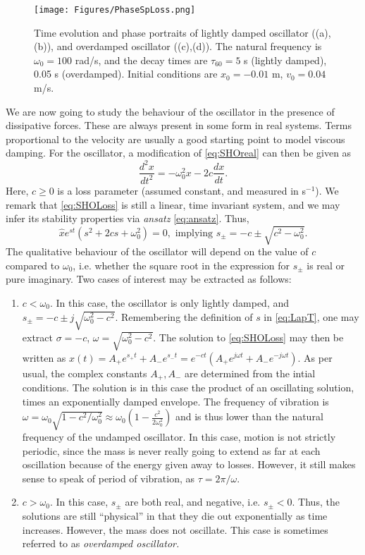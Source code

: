 \documentclass[11pt,twoside,a4paper,english]{book}
\begin{document}
\begin{figure}[hbt]
    \centering
    \texttt{[image: Figures/PhaseSpLoss.png]}
    \caption{Time evolution and phase portraits of lightly damped oscillator ((a),(b)), and overdamped oscillator ((c),(d)). The natural frequency is $\omega_0=100$ rad/s, and the decay times are $\tau_{60}=5$ s (lightly damped), 0.05 s (overdamped). Initial conditions are $x_0=-0.01$ m, $v_0=0.04$ m/s.}\label{fig:dampedOsc}
\end{figure}
We are now going to study the behaviour of the oscillator in the presence of dissipative forces. These are always present in some form in real systems. Terms proportional to the velocity are usually a good starting point to model viscous damping. For the oscillator, a modification of \eqref{eq:SHOreal} can then be given as
\begin{equation}\label{eq:SHOLoss}
    \frac{d^2 x}{dt^2} = -\omega_0^2 x - 2c \frac{dx}{dt}.
\end{equation}
Here, $c \geq 0$ is a loss parameter (assumed constant, and measured in s$^{-1}$). We remark that \eqref{eq:SHOLoss} is still a linear, time invariant system, and we may infer its stability properties via \emph{ansatz} \eqref{eq:ansatz}. Thus, 
\begin{equation}\label{eq:LossAnsatz}
    \hat x e^{st}\left(s^2 + 2c s + \omega_0^2 \right) = 0, \,\, \text{implying}\,\, s_{\pm} = -{c} \pm \sqrt{{c}^2 - \omega_0^2}.
\end{equation}
The qualitative behaviour of the oscillator will depend on the value of $c$ compared to $\omega_0$, i.e. whether the square root in the expression for $s_\pm$ is real or pure imaginary. Two cases of interest may be extracted as follows:
\begin{enumerate}
    \item $c<\omega_0$. In this case, the oscillator is only lightly damped, and $s_\pm = -c \pm j \sqrt{\omega_0^2-c^2}$. Remembering the definition of $s$ in \eqref{eq:LapT}, one may extract $\sigma = - c$, $\omega = \sqrt{\omega_0^2-c^2}$. The solution to \eqref{eq:SHOLoss} may then be written as $x(t) = A_+ e^{s_+ t} + A_- e^{s_- t} = e^{-c t}\left(A_+ e^{j \omega t} + A_- e^{-j\omega t} \right)$. As per usual, the complex constants $A_+,A_-$ are determined from the intial conditions. The solution is in this case the product of an oscillating solution, times an exponentially damped envelope. The frequency of vibration is $\omega = \omega_0\sqrt{1 - c^2/\omega_0^2}\approx \omega_0\left(1 - \frac{c^2}{2\omega_0^2} \right)$ and is thus lower than the natural frequency of the undamped oscillator. In this case, motion is not strictly periodic, since the mass is never really going to extend as far at each oscillation because of the energy given away to losses. However, it still makes sense to speak of period of vibration, as $\tau = 2\pi / \omega.$ 
    \item $c>\omega_0$. In this case, $s_\pm$ are both real, and negative, i.e. $s_\pm < 0$. Thus, the solutions are still ``physical'' in that they die out exponentially as time increases. However, the mass does not oscillate. This case is sometimes referred to as \emph{overdamped oscillator.}
\end{enumerate}
\end{document}
